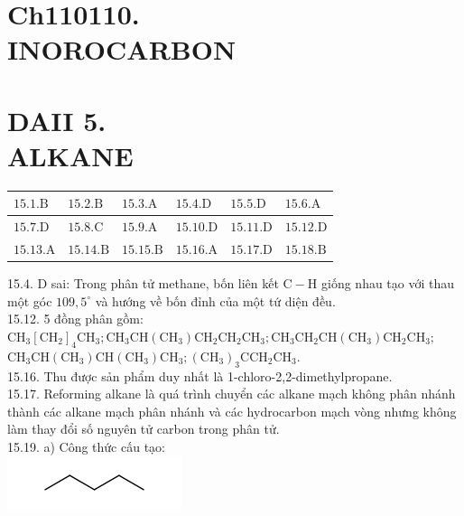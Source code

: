 \documentclass[10pt]{article}
\begin{document}
\section*{Ch110110. \\
 INOROCARBON}
\section*{DAII 5. \\
 ALKANE}
\begin{center}
\begin{tabular}{|l|l|l|l|l|l|}
\hline
$15.1 . \mathrm{B}$ & $15.2 . \mathrm{B}$ & $15.3 . \mathrm{A}$ & $15.4 . \mathrm{D}$ & $15.5 . \mathrm{D}$ & $15.6 . \mathrm{A}$ \\
\hline
$15.7 . \mathrm{D}$ & $15.8 . \mathrm{C}$ & $15.9 . \mathrm{A}$ & $15.10 . \mathrm{D}$ & $15.11 . \mathrm{D}$ & $15.12 . \mathrm{D}$ \\
\hline
$15.13 . \mathrm{A}$ & $15.14 . \mathrm{B}$ & $15.15 . \mathrm{B}$ & $15.16 . \mathrm{A}$ & $15.17 . \mathrm{D}$ & $15.18 . \mathrm{B}$ \\
\hline
\end{tabular}
\end{center}

15.4. D sai: Trong phân tử methane, bốn liên kết $\mathrm{C}-\mathrm{H}$ giống nhau tạo với thau một góc $109,5^{\circ}$ và hướng về bốn đỉnh của một tứ diện đều.\\
15.12. 5 đồng phân gồm:\\
$\mathrm{CH}_{3}\left[\mathrm{CH}_{2}\right]_{4} \mathrm{CH}_{3} ; \mathrm{CH}_{3} \mathrm{CH}\left(\mathrm{CH}_{3}\right) \mathrm{CH}_{2} \mathrm{CH}_{2} \mathrm{CH}_{3} ; \mathrm{CH}_{3} \mathrm{CH}_{2} \mathrm{CH}\left(\mathrm{CH}_{3}\right) \mathrm{CH}_{2} \mathrm{CH}_{3} ;$\\
$\mathrm{CH}_{3} \mathrm{CH}\left(\mathrm{CH}_{3}\right) \mathrm{CH}\left(\mathrm{CH}_{3}\right) \mathrm{CH}_{3} ;\left(\mathrm{CH}_{3}\right)_{3} \mathrm{CCH}_{2} \mathrm{CH}_{3}$.\\
15.16. Thu được sản phẩm duy nhất là 1-chloro-2,2-dimethylpropane.\\
15.17. Reforming alkane là quá trình chuyển các alkane mạch không phân nhánh thành các alkane mạch phân nhánh và các hydrocarbon mạch vòng nhưng không làm thay đổi số nguyên tử carbon trong phân tử.\\
15.19. a) Công thức cấu tạo:\\
\includegraphics{smile-72adf3ca2775db4852c7dc2055d55c10ac742ee1}
\end{document}
